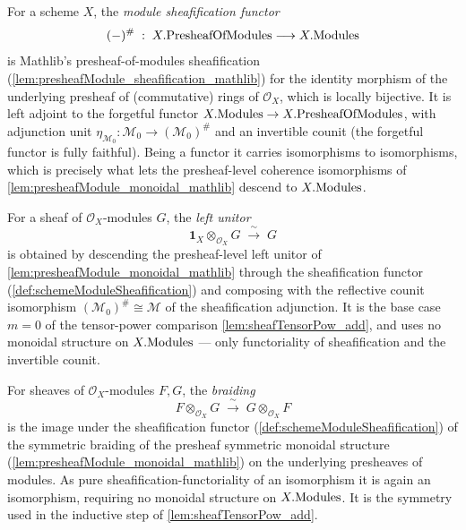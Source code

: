 \begin{definition}\leanok
  \label{def:schemeModuleSheafification}
  For a scheme \(X\), the \emph{module sheafification functor}
  \[
    (-)^{\#} \;:\; X.\mathrm{PresheafOfModules} \longrightarrow X.\mathrm{Modules}
  \]
  is Mathlib's presheaf-of-modules sheafification
  (\cref{lem:presheafModule_sheafification_mathlib}) for the identity morphism of
  the underlying presheaf of (commutative) rings of \(\mathcal{O}_X\), which is
  locally bijective. It is left adjoint to the forgetful functor
  \(X.\mathrm{Modules} \to X.\mathrm{PresheafOfModules}\), with adjunction unit
  \(\eta_{\mathcal{M}_0} : \mathcal{M}_0 \to (\mathcal{M}_0)^{\#}\) and an
  invertible counit (the forgetful functor is fully faithful). Being a functor it
  carries isomorphisms to isomorphisms, which is precisely what lets the
  presheaf-level coherence isomorphisms of
  \cref{lem:presheafModule_monoidal_mathlib} descend to \(X.\mathrm{Modules}\).
\end{definition}

\begin{definition}\leanok
  \label{def:tensorObjUnitIso}
  For a sheaf of \(\mathcal{O}_X\)-modules \(G\), the \emph{left unitor}
  \[
    \mathbf{1}_X \otimes_{\mathcal{O}_X} G \;\xrightarrow{\ \sim\ }\; G
  \]
  is obtained by descending the presheaf-level left unitor of
  \cref{lem:presheafModule_monoidal_mathlib} through the sheafification functor
  (\cref{def:schemeModuleSheafification}) and composing with the reflective counit
  isomorphism \((\mathcal{M}_0)^{\#} \cong \mathcal{M}\) of the sheafification
  adjunction. It is the base case \(m = 0\) of the tensor-power comparison
  \cref{lem:sheafTensorPow_add}, and uses no monoidal structure on
  \(X.\mathrm{Modules}\) --- only functoriality of sheafification and the invertible
  counit.
\end{definition}

\begin{definition}\leanok
  \label{def:tensorBraiding}
  For sheaves of \(\mathcal{O}_X\)-modules \(F, G\), the \emph{braiding}
  \[
    F \otimes_{\mathcal{O}_X} G \;\xrightarrow{\ \sim\ }\;
      G \otimes_{\mathcal{O}_X} F
  \]
  is the image under the sheafification functor
  (\cref{def:schemeModuleSheafification}) of the symmetric braiding of the
  presheaf symmetric monoidal structure (\cref{lem:presheafModule_monoidal_mathlib})
  on the underlying presheaves of modules. As pure sheafification-functoriality of
  an isomorphism it is again an isomorphism, requiring no monoidal structure on
  \(X.\mathrm{Modules}\). It is the symmetry used in the inductive step of
  \cref{lem:sheafTensorPow_add}.
\end{definition}

